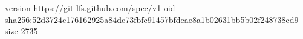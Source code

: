 version https://git-lfs.github.com/spec/v1
oid sha256:52d3724c176162925a84dc73fbfc91457bfdeae8a1b02631bb5b02f248738ed9
size 2735
